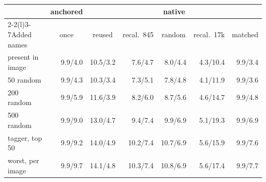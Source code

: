 \setlength{\tabcolsep}{4pt}\begin{tabular}{@{}lrrrrrr@{}}
\toprule
& \multicolumn{1}{c}{anchored} & \multicolumn{5}{c}{native} \\ \cmidrule(lr){2-2}\cmidrule(l){3-7}Added names & \multicolumn{1}{c}{once} & \multicolumn{1}{c}{reused} & \multicolumn{1}{c}{recal.\ 845} & \multicolumn{1}{c}{random} & \multicolumn{1}{c}{recal.\ 17k} & \multicolumn{1}{c}{matched} \\
\midrule
present in image & 9.9/4.0 & 10.5/3.2 & 7.6/4.7 & 8.0/4.4 & 4.3/10.4 & 9.9/3.4 \\
50 random & 9.9/4.3 & 10.3/3.4 & 7.3/5.1 & 7.8/4.8 & 4.1/11.9 & 9.9/3.6 \\
200 random & 9.9/5.9 & 11.6/3.9 & 8.2/6.0 & 8.7/5.6 & 4.6/14.7 & 9.9/4.8 \\
500 random & 9.9/9.0 & 13.0/4.7 & 9.4/7.4 & 9.9/6.9 & 5.1/19.3 & 9.9/6.9 \\
tagger, top 50 & 9.9/9.2 & 14.0/4.9 & 10.2/7.4 & 10.7/6.9 & 5.6/15.9 & 9.9/7.6 \\
worst, per image & 9.9/9.7 & 14.1/4.8 & 10.3/7.4 & 10.8/6.9 & 5.6/17.4 & 9.9/7.7 \\
\bottomrule
\end{tabular}
